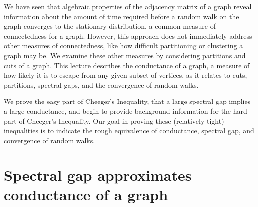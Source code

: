 \documentclass[11pt]{article}
\newcommand{\1}{\mathbf{1}}
\newcommand{\0}{\mathbf{0}}
\begin{document}


We have seen that algebraic properties of the adjacency matrix of a graph reveal information about the amount of time required before a random walk on the graph converges to the stationary distribution, a common measure of connectedness for a graph.
However, this approach does not immediately address other measures of connectedness, like how difficult partitioning or clustering a graph may be.
We examine these other measures by considering partitions and cuts of a graph.
This lecture describes the conductance of a graph, a measure of how likely it is to escape from any given subset of vertices, as it relates to cuts, partitions, spectral gaps, and the convergence of random walks.


We prove the easy part of Cheeger's Inequality, that a large spectral gap implies a large conductance, and begin to provide background information for the hard part of Cheeger's Inequality.
Our goal in proving these (relatively tight) inequalities is to indicate the rough equivalence of conductance, spectral gap, and convergence of random walks.

\section{Spectral gap approximates conductance of a graph}
\end{document}
